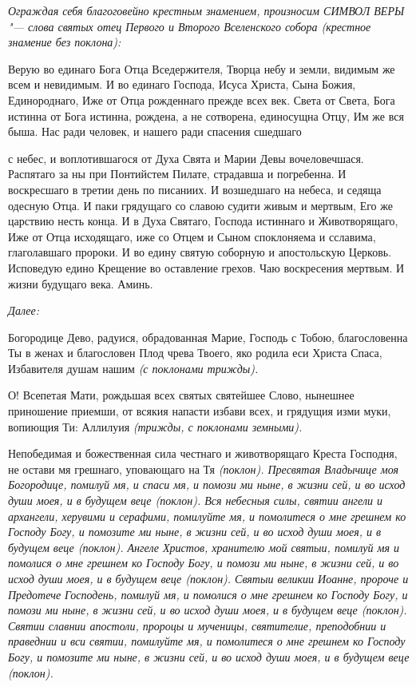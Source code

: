  \itshape Ограждая себя благоговейно крестным знамением, произносим СИМВОЛ
ВЕРЫ "--- слова святых отец Первого и Второго Вселенского собора (крестное
знамение без поклона):\normalfont{}


   Верую во единаго Бога Отца Вседержителя, Творца небу и земли,
видимым же всем и невидимым. И во единаго Господа, Исуса Христа, Сына
Божия, Единороднаго, Иже от Отца рожденнаго прежде всех век. Света от
Света, Бога истинна от Бога истинна, рождена, а не сотворена, единосущна
Отцу, Им же вся быша. Нас ради человек, и нашего ради спасения сшедшаго

с небес, и воплотившагося от Духа Свята и Марии Девы вочеловечшася.
Распятаго за ны при Понтийстем Пилате, страдавша и погребенна. И
воскресшаго в третии день по писаниих. И возшедшаго на небеса, и седяща
одесную Отца. И паки грядущаго со славою судити живым и мертвым, Его
же царствию несть конца. И в Духа Святаго, Господа истиннаго и
Животворящаго, Иже от Отца исходящаго, иже со Отцем и Сыном
споклоняема и сславима, глаголавшаго пророки. И во едину святую
соборную и апостольскую Церковь. Исповедую едино Крещение во
оставление грехов. Чаю воскресения мертвым. И жизни будущаго века.
Аминь.


 \itshape Далее:\normalfont{}


   Богородице Дево, радуися, обрадованная Марие, Господь с Тобою,
благословенна Ты в женах и благословен Плод чрева Твоего, яко
родила еси Христа Спаса, Избавителя душам нашим \itshape (с поклонами
трижды)\normalfont{}.


   О! Всепетая Мати, рождьшая всех святых святейшее Слово, нынешнее
приношение приемши, от всякия напасти избави всех, и грядущия изми
муки, вопиющия Ти: Аллилуия \itshape (трижды, с поклонами земными)\normalfont{}.


   Непобедимая и божественная сила честнаго и животворящаго Креста
Господня, не остави мя грешнаго, уповающаго на Тя \itshape (поклон)\normalfont{}. Пресвятая
Владычице моя Богородице, помилуй мя, и спаси мя, и помози ми ныне, в
жизни сей, и во исход души моея, и в будущем веце \itshape (поклон)\normalfont{}. Вся небесныя
силы, святии ангели и архангели, херувими и серафими, помилуйте
мя, и помолитеся о мне грешнем ко Господу Богу, и помозите ми
ныне, в жизни сей, и во исход души моея, и в будущем веце \itshape (поклон)\normalfont{}.
Ангеле Христов, хранителю мой святыи, помилуй мя и помолися о
мне грешнем ко Господу Богу, и помози ми ныне, в жизни сей, и
во исход души моея, и в будущем веце \itshape (поклон)\normalfont{}. Святыи великии
Иоанне, пророче и Предотече Господень, помилуй мя, и помолися о мне
грешнем ко Господу Богу, и помози ми ныне, в жизни сей, и во исход
души моея, и в будущем веце \itshape (поклон)\normalfont{}. Святии славнии апостоли,
пророцы и мученицы, святителие, преподобнии и праведнии и вси
святии, помилуйте мя, и помолитеся о мне грешнем ко Господу Богу, и
помозите ми ныне, в жизни сей, и во исход души моея, и в будущем веце
\itshape (поклон)\normalfont{}.


